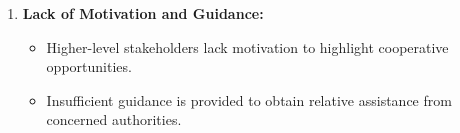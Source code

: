 \begin{enumerate}
    \item \textbf{Lack of Motivation and Guidance:}
        \begin{itemize}
            \item Higher-level stakeholders lack motivation to highlight cooperative opportunities.
            \item Insufficient guidance is provided to obtain relative assistance from concerned authorities.
        \end{itemize}
\end{enumerate}


